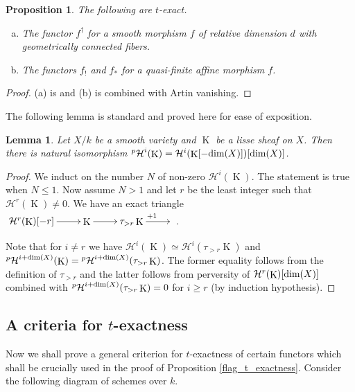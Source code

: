 \documentclass[12pt, reqno]{amsart}
\theoremstyle{plain}
\newtheorem{lem}[thm]{\bf Lemma}
\newtheorem{prop}[thm]{\bf Proposition}
\theoremstyle{definition}
\theoremstyle{definition}
\newcommand{\ccH}{{\mathcal H}}
\newcommand{\cpH}{{^p\mathcal{H}}}
\DeclareMathOperator{\KK}{K}
\begin{document}
\begin{prop}\label{t-exact_collection}
The following are $t$-exact.
\begin{enumerate}[(a)]
\item The functor $f^{\dagger}$ for a smooth morphism $f$ of relative dimension $d$ with geometrically connected fibers.

\item The functors $f_!$ and $f_*$ for a quasi-finite affine morphism $f$.

\end{enumerate}

\end{prop}

\begin{proof}
(a) is \cite[Proposition 4.2.5]{BBDG18} and (b) is \cite[Proposition 2.2.5]{BBDG18} combined with Artin vanishing.
\end{proof}

The following lemma is standard and proved here for ease of exposition. 

\begin{lem}\label{perverse_usual}
Let $X/k$ be a smooth variety and $\KK$ be a lisse sheaf on $X$. Then there is natural isomorphism $\cpH^{i}(\KK)=\ccH^{i}(\KK[-\textup{dim}(X)])[\textup{dim}(X)]$.
\end{lem}

\begin{proof}
We induct on the number $N$ of non-zero $\ccH^i(\KK)$. The statement is true when $N \leq 1$. Now assume $N>1$ and let $r$ be the least integer such that $\ccH^r(\KK) \neq 0$. We have an exact triangle $\xymatrix{\ccH^{r}(\KK)[-r] \ar[r] & \KK \ar[r] & \tau_{>r}\KK \ar^{+1}[r]&}$.

 Note that for $i\neq r$ we have $\ccH^i(\KK) \simeq \ccH^{i}(\tau_{>r}\KK)$ and $\cpH^{i+\textup{dim}(X)}(\KK)=\cpH^{i+\textup{dim}(X)}(\tau_{>r}\KK)$. The former equality follows from the definition of $\tau_{>r}$ and the latter follows from perversity of $\ccH^{r}(\KK)[\textup{dim}(X)]$ combined with $\cpH^{i+\textup{dim}(X)}(\tau_{>r}\KK)=0$ for $i \geq r$ (by induction hypothesis).
\end{proof}

\subsection{A criteria for $t$-exactness}\label{vanishing_lemma}

 Now we shall prove a general criterion for $t$-exactness of certain functors which shall be crucially used in the proof of Proposition \ref{flag_t_exactness}. Consider the following diagram of schemes over $k$.
\end{document}
